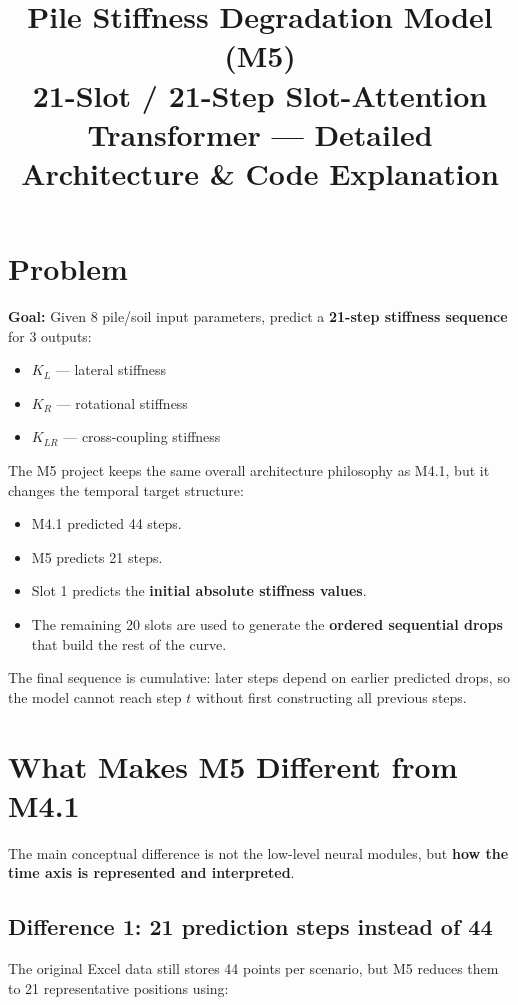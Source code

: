 \documentclass[11pt,a4paper]{article}
\title{\textbf{Pile Stiffness Degradation Model (M5)}\\[0.3cm]\large 21-Slot / 21-Step Slot-Attention Transformer --- Detailed Architecture \& Code Explanation}
\author{}
\date{}
\begin{document}
\maketitle

\section{Problem}

\textbf{Goal:} Given 8 pile/soil input parameters, predict a \textbf{21-step stiffness sequence} for 3 outputs:
\begin{itemize}[nosep]
    \item $K_L$ --- lateral stiffness
    \item $K_R$ --- rotational stiffness
    \item $K_{LR}$ --- cross-coupling stiffness
\end{itemize}

The M5 project keeps the same overall architecture philosophy as M4.1, but it changes the temporal target structure:
\begin{itemize}[nosep]
    \item M4.1 predicted 44 steps.
    \item M5 predicts 21 steps.
    \item Slot 1 predicts the \textbf{initial absolute stiffness values}.
    \item The remaining 20 slots are used to generate the \textbf{ordered sequential drops} that build the rest of the curve.
\end{itemize}

The final sequence is cumulative: later steps depend on earlier predicted drops, so the model cannot reach step $t$ without first constructing all previous steps.

\section{What Makes M5 Different from M4.1}

The main conceptual difference is not the low-level neural modules, but \textbf{how the time axis is represented and interpreted}.

\subsection*{Difference 1: 21 prediction steps instead of 44}
The original Excel data still stores 44 points per scenario, but M5 reduces them to 21 representative positions using:
\end{document}
